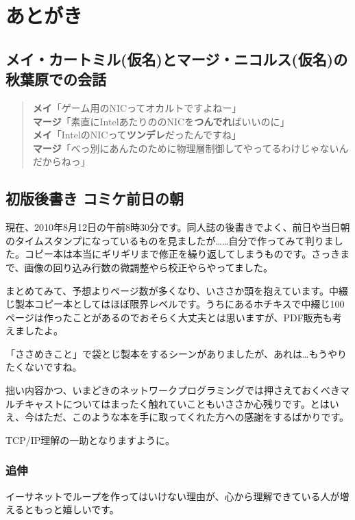 \chapter{あとがき}

\section*{メイ・カートミル(仮名)とマージ・ニコルス(仮名)の秋葉原での会話}

\begin{quotation}
\noindent
{\bf メイ}「ゲーム用のNICってオカルトですよねー」　\\
{\bf マージ}「素直にIntelあたりののNICを{\bf つんでれ}ばいいのに」 \\
{\bf メイ}「IntelのNICって{\bf ツンデレ}だったんですね」 \\
{\bf マージ}「べっ別にあんたのために物理層制御してやってるわけじゃないんだからねっ」 \\
\end{quotation}

\section*{初版後書き コミケ前日の朝}

現在、2010年8月12日の午前8時30分です。同人誌の後書きでよく、前日や当日朝のタイムスタンプになっているものを見ましたが……自分で作ってみて判りました。コピー本は本当にギリギリまで修正を繰り返してしまうものです。さっきまで、画像の回り込み行数の微調整やら校正やらやってました。

まとめてみて、予想よりページ数が多くなり、いささか頭を抱えています。中綴じ製本コピー本としてはほぼ限界レベルです。うちにあるホチキスで中綴じ100ページは作ったことがあるのでおそらく大丈夫とは思いますが、PDF販売も考えましたよ。

「ささめきこと」で袋とじ製本をするシーンがありましたが、あれは…もうやりたくないですね。

拙い内容かつ、いまどきのネットワークプログラミングでは押さえておくべきマルチキャストについてはまったく触れていこともいささか心残りです。とはいえ、今はただ、このような本を手に取ってくれた方への感謝をするばかりです。

TCP/IP理解の一助となりますように。

\subsection*{追伸}
イーサネットでループを作ってはいけない理由が、心から理解できている人が増えるともっと嬉しいです。

